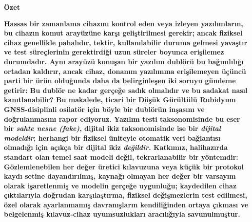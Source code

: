 \documentclass[9pt,twocolumn,a4paper]{extarticle}
\begin{document}
\shorthandoff{=}
\graphicspath{{figures/}}


\begin{center}
    {\fontsize{10}{12}\selectfont\bfseries Özet \par}
\end{center}
\vspace{-10pt}
\noindent \textbf{Hassas bir zamanlama cihazını kontrol eden veya izleyen yazılımların, bu cihazın komut arayüzüne karşı geliştirilmesi gerekir; ancak fiziksel cihaz genellikle pahalıdır, tektir, kullanılabilir duruma gelmesi yavaştır ve test süreçlerinin gerektirdiği uzun süreler boyunca erişilemez durumdadır. Aynı arayüzü konuşan bir yazılım dublörü bu bağımlılığı ortadan kaldırır, ancak cihaz, donanım yazılımına erişilemeyen üçüncü parti bir ürün olduğunda daha da belirginleşen iki soruyu gündeme getirir: Bu dublör ne kadar gerçeğe sadık olmalıdır ve bu sadakat nasıl kanıtlanabilir? Bu makalede, ticari bir Düşük Gürültülü Rubidyum GNSS-disiplinli osilatör için böyle bir dublörün inşasını ve doğrulanmasını rapor ediyoruz. Yazılım testi taksonomisinde bu eser bir \textit{sahte nesne (fake)}, dijital ikiz taksonomisinde ise bir \textit{dijital modeldir}; herhangi bir fiziksel üniteyle otomatik veri bağlantısı olmadığı için açıkça bir dijital ikiz \textit{değildir}. Katkımız, halihazırda standart olan temel saat modeli değil, tekrarlanabilir bir yöntemdir: Gözlemlenebilen her değer üretici kılavuzuna veya küçük bir protokol kaydı setine dayandırılmış, kaynağı olmayan her değer bir varsayım olarak işaretlenmiş ve modelin gerçeğe uygunluğu; kaydedilen cihaz çıktılarıyla doğrudan karşılaştırma, fiziksel değişmezlerin test edilmesi, özel olarak ayarlanmamış davranışların kendiliğinden ortaya çıkması ve belgelenmiş kılavuz-cihaz uyumsuzlukları aracılığıyla savunulmuştur.}
\vspace{-7pt}
\end{document}
